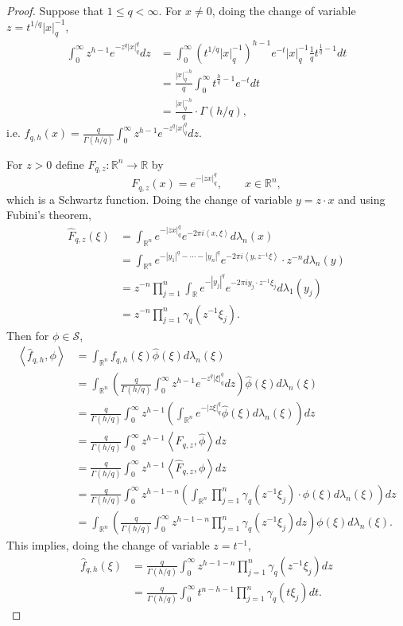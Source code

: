 \documentclass{article}
\newcommand{\inner}[2]{\left\langle #1, #2 \right\rangle}
\theoremstyle{definition}
\theoremstyle{definition}
\begin{document}
\begin{proof}
Suppose that $1 \leq q < \infty$. 
For $x \neq 0$, doing the change of variable $z=t^{1/q} |x|_q^{-1}$,
\begin{align*}
\int_0^\infty z^{h-1} e^{-z^q |x|_q^q} dz&=\int_0^\infty (t^{1/q} |x|_q^{-1})^{h-1} e^{-t} |x|_q^{-1} \frac{1}{q} t^{\frac{1}{q}-1} dt\\
&=\frac{|x|_q^{-h}}{q} \int_0^\infty t^{\frac{h}{q}-1} e^{-t} dt\\
&=\frac{|x|_q^{-h}}{q} \cdot \Gamma(h/q),
\end{align*}
i.e. $f_{q,h}(x) = \frac{q}{\Gamma(h/q)} \int_0^\infty z^{h-1} e^{-z^q |x|_q^q} dz$.

For  $z>0$ define $F_{q,z}:\mathbb{R}^n \to \mathbb{R}$ by
\[
F_{q,z}(x) = e^{-|zx|_q^q},\qquad x \in \mathbb{R}^n,
\]
which is a Schwartz function. Doing the change of variable
$y=z\cdot x$ and using Fubini's theorem,
\begin{align*}
\widehat{F}_{q,z}(\xi)&=\int_{\mathbb{R}^n} e^{-|zx|_q^q} e^{-2\pi i\inner{x}{\xi}} d\lambda_n(x)\\
&=\int_{\mathbb{R}^n} e^{-|y_1|^q-\cdots-|y_n|^q} e^{-2\pi i\inner{y}{z^{-1}\xi}} \cdot z^{-n} d\lambda_n(y)\\
&=z^{-n} \prod_{j=1}^n \int_{\mathbb{R}} e^{-|y_j|^q} e^{-2\pi iy_j \cdot z^{-1} \xi_j} d\lambda_1(y_j)\\
&=z^{-n} \prod_{j=1}^n \gamma_q(z^{-1}\xi_j).
\end{align*}
Then for $\phi \in \mathscr{S}$,
\begin{align*}
\inner{\widehat{f}_{q,h}}{\phi}&=\int_{\mathbb{R}^n} f_{q,h}(\xi) \widehat{\phi}(\xi) d\lambda_n(\xi)\\
&=\int_{\mathbb{R}^n} \left( \frac{q}{\Gamma(h/q)} \int_0^\infty z^{h-1} e^{-z^q |\xi|_q^q} dz\right)  \widehat{\phi}(\xi) d\lambda_n(\xi)\\
&=\frac{q}{\Gamma(h/q)} \int_0^\infty z^{h-1} \left( \int_{\mathbb{R}^n} e^{-|z\xi|_q^q}  \widehat{\phi}(\xi) d\lambda_n(\xi) \right) dz\\
&=\frac{q}{\Gamma(h/q)} \int_0^\infty z^{h-1} \inner{F_{q,z}}{\widehat{\phi}} dz\\
&=\frac{q}{\Gamma(h/q)} \int_0^\infty z^{h-1} \inner{\widehat{F}_{q,z}}{\phi} dz\\
&=\frac{q}{\Gamma(h/q)} \int_0^\infty z^{h-1-n} \left(\int_{\mathbb{R}^n} \prod_{j=1}^n \gamma_q(z^{-1}\xi_j) \cdot \phi(\xi) d\lambda_n(\xi)\right)
dz\\
&= \int_{\mathbb{R}^n} \left(\frac{q}{\Gamma(h/q)}\int_0^\infty z^{h-1-n} \prod_{j=1}^n \gamma_q(z^{-1}\xi_j) dz\right) \phi(\xi) d\lambda_n(\xi).
\end{align*}
This implies, doing the change of variable $z=t^{-1}$,
\begin{align*}
\widehat{f}_{q,h}(\xi)&=\frac{q}{\Gamma(h/q)}\int_0^\infty z^{h-1-n} \prod_{j=1}^n \gamma_q(z^{-1}\xi_j) dz\\
&=\frac{q}{\Gamma(h/q)}\int_0^\infty t^{n-h-1} \prod_{j=1}^n \gamma_q(t\xi_j) dt.
\end{align*}
\end{proof}
\end{document}
